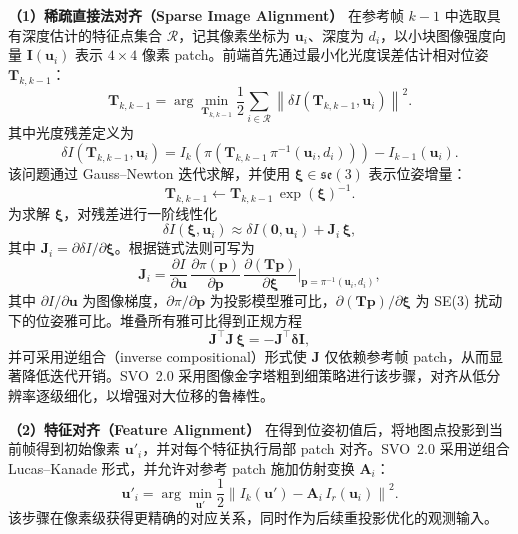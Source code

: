 \textbf{（1）稀疏直接法对齐（Sparse Image Alignment）}
在参考帧 $k-1$ 中选取具有深度估计的特征点集合 $\mathcal{R}$，记其像素坐标为 $\mathbf{u}_i$、深度为 $d_i$，以小块图像强度向量 $\mathbf{I}(\mathbf{u}_i)$ 表示 $4\times4$ 像素 patch。前端首先通过最小化光度误差估计相对位姿 $\mathbf{T}_{k,k-1}$：
\begin{equation}
\mathbf{T}_{k,k-1} = \arg\min_{\mathbf{T}_{k,k-1}} \frac{1}{2} \sum_{i\in\mathcal{R}} \left\| \delta I(\mathbf{T}_{k,k-1}, \mathbf{u}_i) \right\|^2.
\end{equation}
其中光度残差定义为
\begin{equation}
\delta I(\mathbf{T}_{k,k-1}, \mathbf{u}_i) = I_k\!\left( \pi\!\left( \mathbf{T}_{k,k-1} \, \pi^{-1}(\mathbf{u}_i, d_i) \right) \right) - I_{k-1}(\mathbf{u}_i).
\end{equation}
该问题通过 Gauss--Newton 迭代求解，并使用 $\boldsymbol{\xi}\in\mathfrak{se}(3)$ 表示位姿增量：
\begin{equation}
\mathbf{T}_{k,k-1} \leftarrow \mathbf{T}_{k,k-1}\,\exp(\boldsymbol{\xi})^{-1}.
\end{equation}
为求解 $\boldsymbol{\xi}$，对残差进行一阶线性化
\begin{equation}
\delta I(\boldsymbol{\xi}, \mathbf{u}_i) \approx \delta I(\mathbf{0}, \mathbf{u}_i) + \mathbf{J}_i \, \boldsymbol{\xi},
\end{equation}
其中 $\mathbf{J}_i = \partial \delta I / \partial \boldsymbol{\xi}$。根据链式法则可写为
\begin{equation}
\mathbf{J}_i = \frac{\partial I}{\partial \mathbf{u}}\, \frac{\partial \pi(\mathbf{p})}{\partial \mathbf{p}}\, \frac{\partial (\mathbf{T}\mathbf{p})}{\partial \boldsymbol{\xi}}\Bigg|_{\mathbf{p}=\pi^{-1}(\mathbf{u}_i,d_i)},
\end{equation}
其中 $\partial I/\partial \mathbf{u}$ 为图像梯度，$\partial \pi/\partial \mathbf{p}$ 为投影模型雅可比，$\partial (\mathbf{T}\mathbf{p})/\partial \boldsymbol{\xi}$ 为 SE(3) 扰动下的位姿雅可比。堆叠所有雅可比得到正规方程
\begin{equation}
\mathbf{J}^\top \mathbf{J}\, \boldsymbol{\xi} = -\mathbf{J}^\top \boldsymbol{\delta I},
\end{equation}
并可采用逆组合（inverse compositional）形式使 $\mathbf{J}$ 仅依赖参考帧 patch，从而显著降低迭代开销。SVO~2.0 采用图像金字塔粗到细策略进行该步骤，对齐从低分辨率逐级细化，以增强对大位移的鲁棒性。

\textbf{（2）特征对齐（Feature Alignment）}
在得到位姿初值后，将地图点投影到当前帧得到初始像素 $\mathbf{u}'_i$，并对每个特征执行局部 patch 对齐。SVO~2.0 采用逆组合 Lucas--Kanade 形式，并允许对参考 patch 施加仿射变换 $\mathbf{A}_i$：
\begin{equation}
\mathbf{u}'_i = \arg\min_{\mathbf{u}'} \frac{1}{2}\left\| I_k(\mathbf{u}') - \mathbf{A}_i \, I_r(\mathbf{u}_i) \right\|^2.
\end{equation}
该步骤在像素级获得更精确的对应关系，同时作为后续重投影优化的观测输入。

